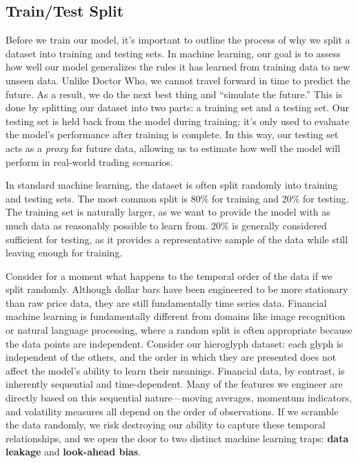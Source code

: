 \subsection{Train/Test Split}

Before we train our model, it's important to outline the process of why we split a dataset
into training and testing sets.
In machine learning, our goal is to assess how well our model generalizes the rules it has learned
from training data to new unseen data.
Unlike Doctor Who, we cannot travel forward in time to predict the future. As a result, we do the
next best thing and ``simulate the future.''
This is done by splitting our dataset into two parts: a training set and a testing set.
Our testing set is held back from the model during training; it's only used to evaluate the model's
performance after training is complete.
In this way, our testing set acts as a \textit{proxy} for future data, allowing us to estimate how
well the model will perform in real-world trading scenarios.

In standard machine learning, the dataset is often split randomly into training and testing sets.
The most common split is 80\% for training and 20\% for testing.
The training set is naturally larger, as we want to provide the model with as much data as reasonably
possible to learn from.
20\% is generally considered sufficient for testing, as it provides a representative sample of the
data while still leaving enough for training.

Consider for a moment what happens to the temporal order of the data if we split randomly.
Although dollar bars have been engineered to be more stationary than raw price data, they are still
fundamentally time series data.
Financial machine learning is fundamentally different from domains like image recognition or natural
language processing, where a random split is often appropriate because the data points are independent.
Consider our hieroglyph dataset: each glyph is independent of the others, and the order in which they
are presented does not affect the model's ability to learn their meanings.
Financial data, by contrast, is inherently sequential and time-dependent.
Many of the features we engineer are directly based on this sequential nature---moving averages,
momentum indicators, and volatility measures all depend on the order of observations.
If we scramble the data randomly, we risk destroying our ability to capture these temporal
relationships, and we open the door to two distinct machine learning traps:
\textbf{data leakage} and \textbf{look-ahead bias}.

